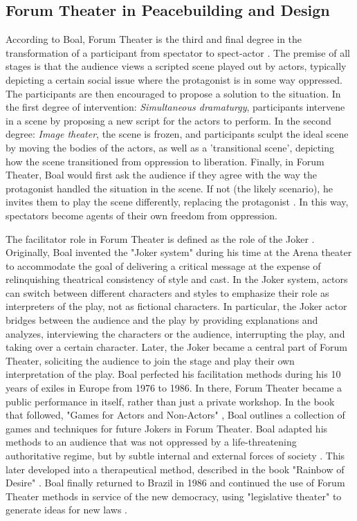 \documentclass[dissertation,math,vertlayout,pdfa,colorlinks,nologo]{aaltoseries}
\begin{document}
\subsection{Forum Theater in Peacebuilding and Design}
According to Boal, Forum Theater is the third and final degree in the transformation of a participant from spectator to spect-actor \cite{boalTheatreOppressed2008}. The premise of all stages is that the audience views a scripted scene played out by actors, typically depicting a certain social issue where the protagonist is in some way oppressed. The participants are then encouraged to propose a solution to the situation. In the first degree of intervention: \textit{Simultaneous dramaturgy}, participants intervene in a scene by proposing a new script for the actors to perform. In the second degree: \textit{Image theater}, the scene is frozen, and participants sculpt the ideal scene by moving the bodies of the actors, as well as a 'transitional scene', depicting how the scene transitioned from oppression to liberation. Finally, in Forum Theater, Boal would first ask the audience if they agree with the way the protagonist handled the situation in the scene. If not (the likely scenario), he invites them to play the scene differently, replacing the protagonist \cite{friedmanPerformanceActivismPrecursors2021, cohen-cruzBoalCompanionDialogues2006}. In this way, spectators become agents of their own freedom from oppression. 

The facilitator role in Forum Theater is defined as the role of the Joker \cite{boalTheatreOppressed2008}. Originally, Boal invented the "Joker system" during his time at the Arena theater to accommodate the goal of delivering a critical message at the expense of relinquishing theatrical consistency of style and cast. In the Joker system, actors can switch between different characters and styles to emphasize their role as interpreters of the play, not as fictional characters. In particular, the Joker actor bridges between the audience and the play by providing explanations and analyzes, interviewing the characters or the audience, interrupting the play, and taking over a certain character. Later, the Joker became a central part of Forum Theater, soliciting the audience to join the stage and play their own interpretation of the play. Boal perfected his facilitation methods during his 10 years of exiles in Europe from 1976 to 1986. In there, Forum Theater became a public performance in itself, rather than just a private workshop. In the book that followed, "Games for Actors and Non-Actors" \cite{boalGamesActorsNonActors2021}, Boal outlines a collection of games and techniques for future Jokers in Forum Theater. Boal adapted his methods to an audience that was not oppressed by a life-threatening authoritative regime, but by subtle internal and external forces of society \cite{cohen-cruzBoalCompanionDialogues2006}. This later developed into a therapeutical method, described in the book "Rainbow of Desire" \cite{boalRainbowDesireBoal2013}. Boal finally returned to Brazil in 1986 and continued the use of Forum Theater methods in service of the new democracy, using "legislative theater" to generate ideas for new laws \cite{cohen-cruzBoalCompanionDialogues2006}.
\end{document}
